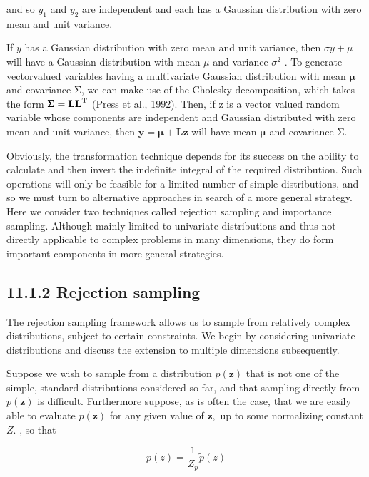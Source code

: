 \documentclass[
  10
]{article}
\begin{document}
and so \(y _ { 1 }\) and \(y _ { 2 }\) are independent and each has a
Gaussian distribution with zero mean and unit variance.

If \(y\) has a Gaussian distribution with zero mean and unit variance,
then \(\sigma y + \mu\) will have a Gaussian distribution with mean
\(\mu\) and variance \(\sigma ^ { 2 }\) . To generate vectorvalued
variables having a multivariate Gaussian distribution with mean
\(\pmb { \mu }\) and covariance Σ, we can make use of the Cholesky
decomposition, which takes the form
\({ \pmb \Sigma } = { \bf L L } ^ { \mathrm { T } }\) (Press et al.,
1992). Then, if z is a vector valued random variable whose components
are independent and Gaussian distributed with zero mean and unit
variance, then \(\mathbf { y } = \pmb { \mu } + \mathbf { L z }\) will
have mean \(\pmb { \mu }\) and covariance Σ.

Obviously, the transformation technique depends for its success on the
ability to calculate and then invert the indefinite integral of the
required distribution. Such operations will only be feasible for a
limited number of simple distributions, and so we must turn to
alternative approaches in search of a more general strategy. Here we
consider two techniques called rejection sampling and importance
sampling. Although mainly limited to univariate distributions and thus
not directly applicable to complex problems in many dimensions, they do
form important components in more general strategies.

\subsection{11.1.2 Rejection sampling}\label{rejection-sampling}

The rejection sampling framework allows us to sample from relatively
complex distributions, subject to certain constraints. We begin by
considering univariate distributions and discuss the extension to
multiple dimensions subsequently.

Suppose we wish to sample from a distribution \(p ( \mathbf { z } )\)
that is not one of the simple, standard distributions considered so far,
and that sampling directly from \(p ( \mathbf { z } )\) is difficult.
Furthermore suppose, as is often the case, that we are easily able to
evaluate \(p ( \mathbf { z } )\) for any given value of
\(\mathbf { z } ,\) up to some normalizing constant \(Z .\) , so that

\[
p (z) = \frac {1}{Z _ {p}} \widetilde {p} (z)\tag{11.13}
\]
\end{document}
